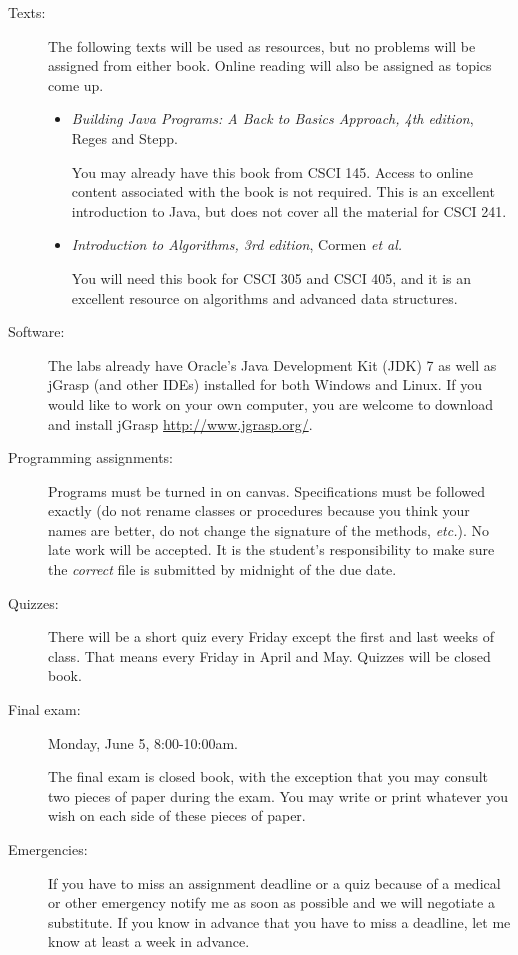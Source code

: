 \documentclass{article}
\begin{document}
\begin{description}
\item[Texts:] The following texts will be used as resources, but no
  problems will be assigned from either book.  Online reading will
  also be assigned as topics come up.
\begin{itemize}
\item {\em Building Java Programs: A Back to Basics Approach, 4th
  edition}, Reges and Stepp.

  You may already have this book from CSCI 145.  Access to online
  content associated with the book is not required.  This is an
  excellent introduction to Java, but does not cover all the material
  for CSCI 241.

  \item {\em Introduction to Algorithms, 3rd edition}, Cormen {\em et
    al.}

    You will need this book for CSCI 305 and CSCI 405, and it is an
    excellent resource on algorithms and advanced data structures.
    
\end{itemize}
\item[Software:] The labs already have Oracle's Java Development Kit
  (JDK) 7 as well as jGrasp (and other IDEs) installed for both
  Windows and Linux.  If you would like to work on your own computer,
  you are welcome to download and install jGrasp
  \url{http://www.jgrasp.org/}.

\item[Programming assignments:] Programs must be turned in on canvas.
  Specifications must be followed exactly (do not rename classes or
  procedures because you think your names are better, do not change
  the signature of the methods, {\em etc.}).
  No late work will be accepted.  It is the student's responsibility
  to make sure the {\em correct} file is submitted by midnight of
  the due date.


\item[Quizzes:]  There will be a short quiz every Friday except the
  first and last weeks of class.  That means every Friday in April and
  May.  Quizzes will be closed book.

\item[Final exam:] Monday, June 5, 8:00-10:00am.
  
The final exam is closed book, with the exception that you may consult
two pieces of paper during the exam.  You may write or print whatever
you wish on each side of these pieces of paper.

\item[Emergencies:] If you have to miss an assignment deadline or a
  quiz because of a medical or other emergency notify me as soon as
  possible and we will negotiate a substitute.  If you know in advance
  that you have to miss a deadline, let me know at least a week in
  advance.


\end{description}
\end{document}
